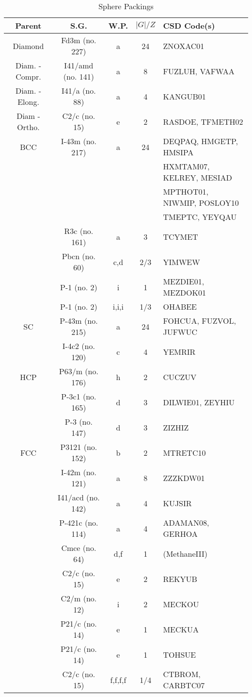 \documentclass{iucr}              %
\begin{document}
\begin{table}
\label{tab_sphere}
\caption{Sphere Packings}
\begin{tabular}{ccccl} %
Parent & S.G. & W.P. & $|G|/Z$& CSD Code(s) \\
\hline
Diamond 	& Fd3m (no. 227) & a 	& 24 	& ZNOXAC01 \\
Diam. - Compr. & I41/amd (no. 141) & a & 8	& FUZLUH, VAFWAA \\
Diam. - Elong.	& I41/a	(no. 88)	 & a 	& 4	& KANGUB01 \\
Diam - Ortho.	& C2/c (no. 15) & e	& 2	& RASDOE, TFMETH02 \\
BCC		& I-43m (no. 217) & a 	& 24 	& DEQPAQ, HMGETP, HMSIPA \\
&		&	& 	& HXMTAM07, KELREY, MESIAD \\
&		&	& 	& MPTHOT01, NIWMIP, POSLOY10 \\
&		&	& 	& TMEPTC, YEYQAU \\
& R3c (no. 161) & a	& 3	& TCYMET \\
& Pbcn (no. 60) & c,d	& 2/3	& YIMWEW \\
& P-1 (no. 2) & i	& 1	& MEZDIE01, MEZDOK01 \\
& P-1 (no. 2) & i,i,i	& 1/3	& OHABEE \\
SC		& P-43m (no. 215) & a 	& 24 	& FOHCUA, FUZVOL, JUFWUC \\
		& I-4c2 (no. 120) & c	& 4	& YEMRIR \\
HCP		& P63/m (no. 176) & h	& 2	& CUCZUV \\
		& P-3c1 (no. 165) & d	& 3	& DILWIE01, ZEYHIU \\
		& P-3 (no. 147) & d	& 3	& ZIZHIZ \\
FCC		& P3121 (no. 152) & b	& 2	& MTRETC10 \\
		& I-42m (no. 121) & a	& 8	& ZZZKDW01 \\
		& I41/acd (no. 142) & a & 4	& KUJSIR \\
		& P-421c (no. 114) & a	& 4	& ADAMAN08, GERHOA \\
		& Cmce (no. 64) & d,f	& 1	& (MethaneIII) \\
		& C2/c (no. 15) & e	& 2	& REKYUB \\
		& C2/m (no. 12) & i	& 2	& MECKOU \\
		& P21/c (no. 14) & e	& 1	& MECKUA \\
		& P21/c (no. 14) & e	& 1	& TOHSUE \\
		& C2/c (no. 15)	& f,f,f,f	& 1/4	& CTBROM, CARBTC07 \\
\hline
\end{tabular}
\end{table}
\end{document}
